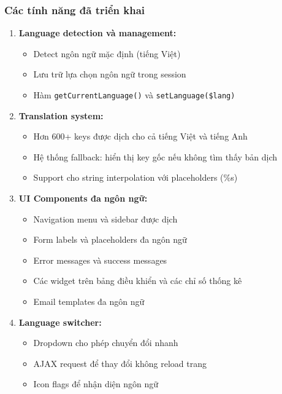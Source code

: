 \documentclass[12pt,a4paper]{report}
\begin{document}
    \subsubsection{Các tính năng đã triển khai}
    \begin{enumerate}
        \item \textbf{Language detection và management:}
        \begin{itemize}
            \item Detect ngôn ngữ mặc định (tiếng Việt)
            \item Lưu trữ lựa chọn ngôn ngữ trong session
            \item Hàm \texttt{getCurrentLanguage()} và \texttt{setLanguage(\$lang)}
        \end{itemize}
        
        \item \textbf{Translation system:}
        \begin{itemize}
            \item Hơn 600+ keys được dịch cho cả tiếng Việt và tiếng Anh
            \item Hệ thống fallback: hiển thị key gốc nếu không tìm thấy bản dịch
            \item Support cho string interpolation với placeholders (\%s)
        \end{itemize}
        
        \item \textbf{UI Components đa ngôn ngữ:}
        \begin{itemize}
            \item Navigation menu và sidebar được dịch
            \item Form labels và placeholders đa ngôn ngữ
            \item Error messages và success messages
        \item Các widget trên bảng điều khiển và các chỉ số thống kê
            \item Email templates đa ngôn ngữ
        \end{itemize}
        
        \item \textbf{Language switcher:}
        \begin{itemize}
            \item Dropdown cho phép chuyển đổi nhanh
            \item AJAX request để thay đổi không reload trang
            \item Icon flags để nhận diện ngôn ngữ
        \end{itemize}
    \end{enumerate}
\end{document}
